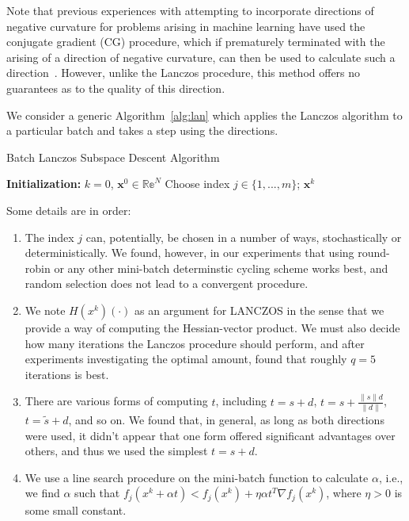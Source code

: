 \documentclass[psamsfonts,onesided,10pt]{amsart}
\theoremstyle{definition}
\theoremstyle{remark}
\numberwithin{equation}{section}
\begin{document}
Note that previous experiences with attempting to incorporate directions of negative curvature for problems arising in machine learning
have used the conjugate gradient (CG) procedure, which if prematurely terminated with the arising of a direction of negative curvature,
can then be used to calculate such a direction~\cite{mizutani2008second, martens2012training}. However, unlike the Lanczos procedure,
this method offers no guarantees as to the quality of this direction. 

We consider a generic Algorithm~\ref{alg:lan} which applies the Lanczos algorithm to a particular batch and takes a step
using the directions. 


\begin{algorithm}[h]
	\caption{Batch Lanczos Subspace Descent Algorithm}
	\label{alg:lan}
	\begin{algorithmic}
		\State \textbf{Initialization:} $k=0$, $\mathbf{x}^0\in\mathbb{Re}^N$
		\State Choose index $j\in\{1,...,m\}$;
                \EndWhile
		\Return $\mathbf{x}^k$
	\end{algorithmic}
\end{algorithm}

Some details are in order:
\begin{enumerate}
\item The index $j$ can, potentially, be chosen in a number of ways, stochastically or deterministically. We found, however, in our
experiments that using round-robin or any other mini-batch determinstic cycling scheme works best, and random selection does not lead to a convergent procedure.
\item We note $H(x^k)(\cdot)$ as an argument for LANCZOS in the sense that we provide a way of computing 
the Hessian-vector product. We must also decide how many iterations the Lanczos procedure should perform, and after experiments investigating
the optimal amount, found that roughly $q=5$ iterations is best.
\item There are various forms of computing $t$, including $t=s+d$, $t=s+\frac{\|s\|d}{\|d\|}$, $t=\tilde s+d$, and so on. We found that, in general,
as long as both directions were used, it didn't appear that one form offered significant advantages over others, and thus we used the simplest $t=s+d$.
\item We use a line search procedure on the mini-batch function to calculate $\alpha$, i.e., we find $\alpha$ such that $f_j(x^k+\alpha t) < f_j(x^k)
+\eta\alpha t^T\nabla f_j(x^k)$, where $\eta>0$ is some small constant.  
\end{enumerate}
\end{document}
